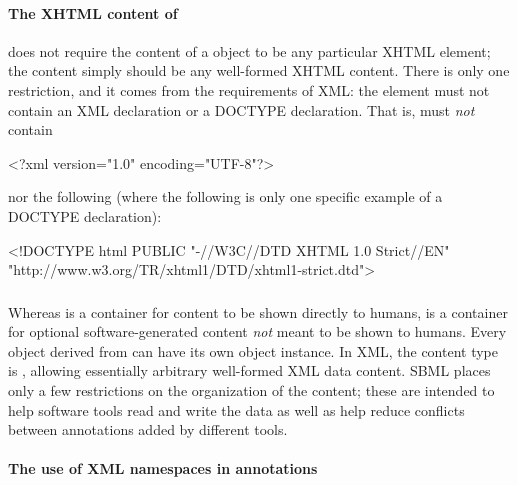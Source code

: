 \paragraph{The XHTML content of }

\sbmlthree does not require the content of a \Notes object to be
any particular XHTML element; the content simply should be any
well-formed XHTML content.  There is only one restriction, and it
comes from the requirements of XML: the  element must
not contain an XML declaration or a DOCTYPE declaration.  That
is,  must \emph{not} contain

\begin{example}
<?xml version="1.0" encoding="UTF-8"?>  
\end{example}

nor the following (where the following is only one specific
example of a DOCTYPE declaration):

\begin{example}
<!DOCTYPE html PUBLIC "-//W3C//DTD XHTML 1.0 Strict//EN"
 "http://www.w3.org/TR/xhtml1/DTD/xhtml1-strict.dtd">
\end{example}


\subsubsection{}
\label{sec:annotation-use}
\label{sec:annotations}

Whereas \Notes is a container for content to be shown directly to
humans, \Annotation is a container for optional software-generated
content \emph{not} meant to be shown to humans.  Every object
derived from \SBase can have its own \Annotation object instance.
In XML, the \Annotation content type is , allowing
essentially arbitrary well-formed XML data content.  SBML places
only a few restrictions on the organization of the content; these
are intended to help software tools read and write the data as
well as help reduce conflicts between annotations added by
different tools.


\paragraph{The use of XML namespaces in annotations}


